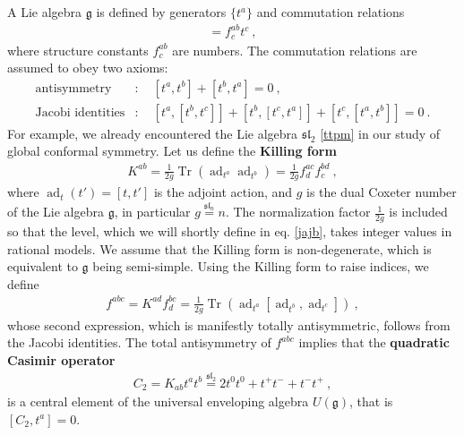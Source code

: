 \documentclass[12pt,a4paper,notitlepage]{report}
\numberwithin{equation}{section}
\theoremstyle{break}
\begin{document}
A Lie algebra $\mathfrak{g}$ is defined by generators $\{t^a\}$ and commutation relations 
\begin{align}
 [t^a,t^b] = f^{ab}_c t^c \ ,
\label{ttft}
\end{align}
where structure constants $f^{ab}_c$ are numbers.
The commutation relations are assumed to obey two axioms:
\begin{align}
 \text{antisymmetry} & : \quad [t^a,t^b] + [t^b,t^a] = 0\ ,
\\
\text{Jacobi identities} & : \quad  [t^a,[t^b,t^c]] + [t^b,[t^c,t^a]] + [t^c,[t^a,t^b]] = 0 \ .
\end{align}
For example, we already encountered the Lie algebra $\mathfrak{sl}_2$ \eqref{ttpm} in our study of global conformal symmetry.
Let us define the \textbf{\boldmath Killing form} 
\begin{align}
 K^{ab} = \frac{1}{2g} \operatorname{Tr} \left(\operatorname{ad}_{t^a}\operatorname{ad}_{t^b}\right) =\frac{1}{2g} f^{ac}_d f^{bd}_c\ ,
\end{align}
where  $\operatorname{ad}_t(t') = [t,t']$ is the adjoint action, and $g$ is the dual Coxeter number of the Lie algebra $\mathfrak{g}$, in particular $g\overset{\mathfrak{sl}_n}{=}n$.
The normalization factor $\frac{1}{2g}$ is included so that the level, which we will shortly define in eq. \eqref{jajb}, takes integer values in rational models.
We assume that the Killing form is non-degenerate, which is equivalent to $\mathfrak{g}$ being semi-simple. 
Using the Killing form to raise indices, we define
\begin{align}
 f^{abc} = K^{ad}f_d^{bc} = \frac{1}{2g}\operatorname{Tr}\left( \operatorname{ad}_{t^a} [\operatorname{ad}_{t^b}, \operatorname{ad}_{t^c}] \right)\ ,
\end{align}
whose second expression, which is manifestly totally antisymmetric, follows from the Jacobi identities.
The total antisymmetry of $f^{abc}$ implies that the \textbf{\boldmath quadratic Casimir operator}
\begin{align}
 C_2 = K_{ab} t^a t^b \overset{\mathfrak{sl}_2}{=} 2t^0t^0+ t^+t^-+t^-t^+\ ,
\label{ctk}
\end{align}
is a central element of the universal enveloping algebra $U(\mathfrak{g})$, that is $[C_2,t^a]=0$.
\end{document}

